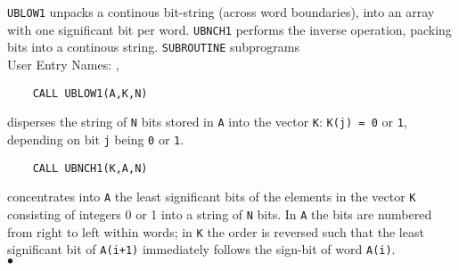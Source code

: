                    
\Submitter{}                          
                   
\begin{center}
\end{center}
{\tt UBLOW1} unpacks a continous bit-string (across word boundaries),
into an array with one significant bit per word. {\tt UBNCH1} performs
the inverse operation, packing bits into a continous string.
\Structure
{\tt SUBROUTINE} subprograms \\
User Entry Names: , 
\Usage
\begin{verbatim}
    CALL UBLOW1(A,K,N)
\end{verbatim}
disperses the string of {\tt N} bits stored in {\tt A} into the vector
{\tt K}: {\tt K(j) = 0} or {\tt 1}, depending on bit {\tt j} being
{\tt 0} or {\tt 1}.
\begin{verbatim}
    CALL UBNCH1(K,A,N)
\end{verbatim}
concentrates into {\tt A} the least significant bits of the elements
in the vector {\tt K} consisting of integers 0 or 1 into a string
of {\tt N} bits. In {\tt A} the bits are numbered from right to left
within words; in {\tt K} the order is reversed such that the least
significant bit of {\tt A(i+1)} immediately follows the sign-bit of word
{\tt A(i)}.
\\ $\bullet$
